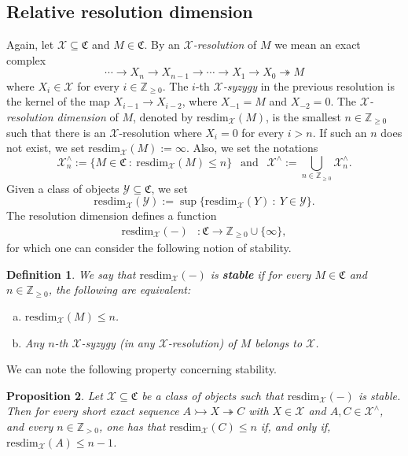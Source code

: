 \documentclass[10pt,reqno]{amsart}
\numberwithin{equation}{section}
\newtheorem{definition}{Definition}[section]
\newtheorem{proposition}[definition]{Proposition}
\theoremstyle{remark}
\newcommand{\C}{\mathfrak{C}}
\newcommand{\X}{\mathcal{X}}
\newcommand{\Y}{\mathcal{Y}}
\newcommand{\resdim}{\mathrm{resdim}}
\begin{document}

\subsection*{Relative resolution dimension}

Again, let $\mathcal{X} \subseteq \mathfrak{C}$ and $M \in \mathfrak{C}$. By an \emph{$\X$-resolution} of $M$ we mean an exact complex 
\[
\cdots \to X_n \to X_{n-1} \to \cdots \to X_1 \to X_0 \twoheadrightarrow M
\] 
where $X_i \in \X$ for every $i \in \mathbb{Z}_{\geq 0}$. The $i$-th \emph{$\X$-syzygy} in the previous resolution is the kernel of the map $X_{i-1} \to X_{i-2}$, where $X_{-1} = M$ and $X_{-2} = 0$. The \emph{$\X$-resolution dimension} of $M$, denoted  by $\resdim_{\X}(M)$, is the smallest $n \in \mathbb{Z}_{\geq 0}$ such that there is an $\X$-resolution where $X_i = 0$ for every $i > n$. If such an $n$ does not exist, we set $\resdim_{\X}(M) := \infty$. Also, we set the notations
\[
\X^{\wedge}_n := \{ M \in \mathfrak{C} \ : \ \resdim_{\mathcal{X}}(M) \leq n \} \ \ \text{ and } \ \ \X^\wedge := \bigcup_{n \in \mathbb{Z}_{\geq 0}} \X^\wedge_n.
\]
Given a class of objects $\Y \subseteq \mathfrak{C}$, we set  
\[
\resdim_{\X}(\Y) := \sup\{ \resdim_{\X}(Y) \ : \ Y \in \Y \}.
\]
The resolution dimension defines a function
\begin{align*}
\resdim_{\mathcal{X}}(-) & \colon \C \to \mathbb{Z}_{\geq 0} \cup \{ \infty \},
\end{align*}
for which one can consider the following notion of stability. 


\begin{definition}\label{def:stable}
We say that $\resdim_{\mathcal{X}}(-)$ is \textbf{stable} if for every $M \in \C$ and $n \in \mathbb{Z}_{\geq 0}$, the following are equivalent:
\begin{enumerate}[(a)]
\item[(a)] $\resdim_{\mathcal{X}}(M) \leq n$.

\item[(b)] Any $n$-th $\mathcal{X}$-syzygy (in any $\X$-resolution) of $M$ belongs to $\mathcal{X}$. 
\end{enumerate}
\end{definition}


We can note the following property concerning stability.


\begin{proposition}\label{prop:stability_in_ses}
Let $\X \subseteq \mathfrak{C}$ be a class of objects such that $\resdim_{\X}(-)$ is stable. Then for every short exact sequence $A \rightarrowtail X \twoheadrightarrow C$ with $X \in \X$ and $A, C \in \X^\wedge$, and every $n \in \mathbb{Z}_{> 0}$, one has that $\resdim_{\X}(C) \leq n$ if, and only if, $\resdim_{\X}(A) \leq n-1$.
\end{proposition}
\end{document}
